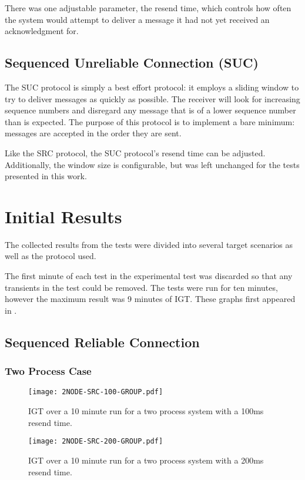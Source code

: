 There was one adjustable parameter, the resend time, which controls how often the system would attempt to deliver a message it had not yet received an acknowledgment for.

\subsection{Sequenced Unreliable Connection (SUC)}

The \ac{SUC} protocol is simply a best effort protocol: it employs a sliding window to try to deliver messages as quickly as possible.
The receiver will look for increasing sequence numbers and disregard any message that is of a lower sequence number than is expected. The purpose of this protocol is to implement a bare minimum: messages are accepted in the order they are sent.

Like the \ac{SRC} protocol, the SUC protocol's resend time can be adjusted. Additionally, the window size is configurable, but was left unchanged for the tests presented in this work.

\section{Initial Results}

The collected results from the tests were divided into several target scenarios as well as the protocol used.

The first minute of each test in the experimental test was discarded so that any transients in the test could be removed.
The tests were run for ten minutes, however the maximum result was 9 minutes of \ac{IGT}.
These graphs first appeared in \cite{CRITIS2012}.

\subsection{Sequenced Reliable Connection}

\subsubsection{Two Process Case}

\begin{figure}
\centering
\begin{minipage}{0.45\textwidth}
    \centering
    \texttt{[image: 2NODE-SRC-100-GROUP.pdf]}
    \caption{\ac{IGT} over a 10 minute run for a two process system with a 100ms resend time.}
    \label{fig:IGT-SRC-2NODE-100}
\end{minipage}%
\qquad
\begin{minipage}{0.45\textwidth}
    \centering
    \texttt{[image: 2NODE-SRC-200-GROUP.pdf]}
    \caption{\ac{IGT} over a 10 minute run for a two process system with a 200ms resend time.}
    \label{fig:IGT-SRC-2NODE-200}
\end{minipage}
\end{figure}

